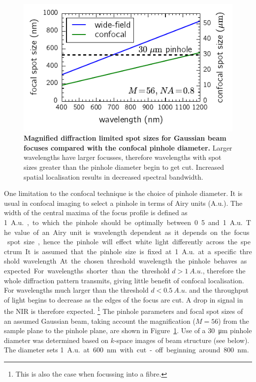 \documentclass{article}
\begin{document}
\begin{figure}[bt]
\centering
\includegraphics{figures/focus_spot_size}
\caption{\textbf{Magnified diffraction limited spot sizes for Gaussian beam focuses compared with the confocal pinhole diameter.} Larger wavelengths have larger focusses, therefore wavelengths with spot sizes greater than the pinhole diameter begin to get cut. Increased spatial localisation results in decreased spectral bandwidth.}
\label{fig:focus_spot_size}
\end{figure}

One limitation to the confocal technique is the choice of pinhole diameter. It is usual in confocal imaging to select a pinhole in terms of Airy units (A.u.). The width of the central maxima of the focus profile is defined as \SI{1}{A.u.}, to which the pinhole should be optimally between 0.5 and \SI{1}{A.u.}. The value of an Airy unit is wavelength dependent as it depends on the focus spot size, hence the pinhole will effect white light differently across the spectrum. It is assumed that the pinhole size is fixed at \SI{1}{A.u.} at a specific threshold wavelength. At the chosen threshold wavelength the pinhole behaves as expected. For wavelengths shorter than the threshold $d>\SI{1}{A.u.}$, therefore the whole diffraction pattern transmits, giving little benefit of confocal localisation. For wavelengths much larger than the threshold $d<\SI{0.5}{A.u.}$ and the throughput of light begins to decrease as the edges of the focus are cut. A drop in signal in the NIR is therefore expected.%
\footnote{This is also the case when focussing into a fibre.}
The pinhole parameters and focal spot sizes of an assumed Gaussian beam, taking account the magnification ($M=56$) from the sample plane to the pinhole plane, are shown in Figure~\ref{fig:focus_spot_size}. Use of a \SI{30}{\micro\metre} pinhole diameter was determined based on $k$-space images of beam structure {\color{red} (see below)}. The diameter sets \SI{1}{A.u.} at \SI{600}{nm} with cut-off beginning around \SI{800}{nm}.
\end{document}
